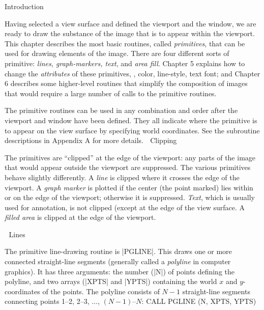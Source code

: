 

\beginsection Introduction

Having selected a view surface and defined the viewport and the window,
we are ready to draw the substance of the image that is to appear within
the viewport.  This chapter describes the most basic routines, called
{\it primitives}, that can be used for drawing elements of the image.  
There are four different sorts of primitive:  {\it lines, graph-markers,
text}, and {\it area fill}.  Chapter 5 explains how to change the 
{\it attributes\/} of these primitives, \eg, color, line-style, text font;
and Chapter 6 describes some higher-level routines that simplify
the composition of images that would require a large number of calls to 
the primitive routines.

The primitive routines can be used in any combination and order after
the viewport and window have been defined.  They all indicate where the
primitive is to appear on the view surface by specifying world
coordinates. See the subroutine descriptions in Appendix A
for more details. 

\beginsection Clipping

The primitives are ``clipped'' at the edge of the viewport: any parts 
of the image that would appear outside the viewport are suppressed.  The 
various primitives behave slightly differently. A {\it line\/} is
clipped where it crosses the edge of the viewport. A {\it graph marker\/}
is plotted if the center (the point marked) lies within or on the edge 
of the viewport; otherwise it is suppressed. {\it Text\/}, which is 
usually used for annotation, is not clipped (except at the edge of the 
view surface. A {\it filled area\/} is clipped at the edge of the
viewport. 


\beginsection Lines

The primitive line-drawing routine is |PGLINE|. This draws one 
or more connected straight-line segments (generally called a {\it 
polyline\/} in computer graphics).  It has three arguments: the number 
(|N|) of points defining the polyline, and two arrays (|XPTS| and 
|YPTS|) containing the world $x$ and $y$-coordinates of the points. 
The polyline consists of $N-1$ straight-line segments connecting 
points 1--2, 2--3, $\ldots$, $(N-1)$--$N$:
\begintt
CALL PGLINE (N, XPTS, YPTS)
\endtt

